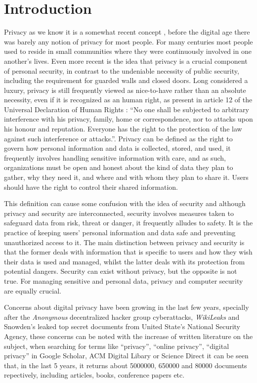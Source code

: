 \documentclass[conference]{IEEEtran}
\begin{document}
\section{Introduction}
Privacy as we know it is a somewhat recent concept \cite{vincent2016privacy, moore2017privacy},
before the digital age there was barely any notion of privacy for most people. For many centuries
most people used to reside in small communities where they were continuously involved in one
another's lives. Even more recent is the idea that privacy is a crucial component of
personal security, in contrast to the undeniable necessity of public security, including
the requirement for guarded walls and closed doors. Long considered a luxury, privacy is
still frequently viewed as nice-to-have rather than an absolute necessity, even if it is
recognized as an human right, as present in article 12 of the Universal Declaration of Human Rights
\cite{RooseveltUniversal}: ``No one shall be subjected to arbitrary interference with his privacy, family,
home or correspondence, nor to attacks upon his honour and reputation. Everyone has
the right to the protection of the law against such interference or attacks.''. Privacy can
be defined \cite{InternationalWhat, SpiekermannEngineering} as the right to govern
how personal information and data is collected, stored, and used, it frequently
involves handling sensitive information with care, and as such, organizations must
be open and honest about the kind of data they plan to gather, why they need it, and
where and with whom they plan to share it. Users should have the right to control their
shared information.

This definition can cause some confusion with the idea of
security \cite{HIVDifference} and although privacy and security are interconnected, security
involves measures taken to safeguard data from risk, threat or danger,
it frequently alludes to safety. It is the practice of keeping users'
personal information and data safe and preventing unauthorized access to it.
The main distinction between privacy and security is that the former deals with information
that is specific to users and how they wish their data is used and managed, whilst the
latter deals with its protection from potential dangers. Security can exist without privacy,
but the opposite is not true. For managing sensitive and personal data, privacy and
computer security are equally crucial.

Concerns about digital privacy have been growing \cite{emami2019exploring, park2022personal, zhang2022peer} in the last few
years, specially after the \textit{Anonymous} decentralized hacker group
cyberattacks, \textit{WikiLeaks} and Snowden's leaked top secret documents from United State's
National Security Agency,
these concerns can be noted with the increase of written literature on the subject,
when searching for terms like ``privacy'', ``online privacy'',
``digital privacy'' in Google Scholar, ACM Digital Libary or Science Direct it
can be seen that, in the last 5 years, it returns about 5000000, 650000 and 80000
documents repectively, including articles, books, conference papers etc.
\end{document}
